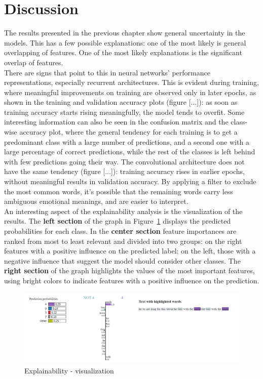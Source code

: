 \chapter*{Discussion}
\label{ch:discussion}
The results presented in the previous chapter show general
uncertainty in the models. This has a few possible explanations:
one of the most likely is general overlapping of features. One of the most likely
explanations is the significant overlap of features.\\

There are signs that point to this in neural networks' performance representations,
especially recurrent architectures.
This is evident during training, where meaningful improvements on training are
observed only in later epochs, as shown in the training and validation accuracy
plots (figure [...]): as soon as training accuracy starts rising meaningfully,
the model tends to overfit. Some interesting information can also be seen in
the confusion matrix and the class-wise accuracy plot, where the general tendency
for each training is to get a predominant class with a large number of predictions,
and a second one with a large percentage of correct predictions, while the rest of
the classes is left behind with few predictions going their way.
The convolutional architecture does not have the same tendency (figure [...]):
training accuracy rises in earlier epochs, without meaningful results in validation
accuracy.
By applying a filter to exclude the most common words, it's possible that the
remaining words carry less ambiguous emotional meanings, and are easier to interpret.\\

An interesting aspect of the explainability analysis is the visualization of the results.
The \textbf{left section} of the graph in Figure~\ref{fig:expl} displays the predicted probabilities for each class. In the \textbf{center section}
feature importances are ranked from most to least relevant and divided into two groups: on the right
features with a positive influence on the predicted label; on the left, those with a negative influence that suggest the model should consider other classes.
The \textbf{right section} of the graph highlights the values of the most important
features, using bright colors to indicate features with a positive influence on the prediction.

\begin{figure}[H]
    \centering
    \includegraphics[scale= 0.55]{pictures/expl.png}
    \caption{Explainability - visualization}
    \label{fig:expl}
\end{figure}

